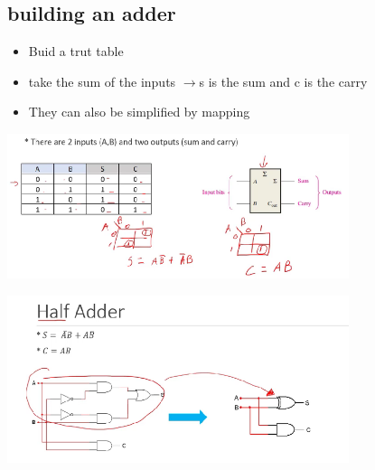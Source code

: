 \documentclass[a4paper,12pt]{article}
\newcommand{\ra}{$\rightarrow$}
\begin{document}
        \subsection{building an adder}
            \begin{itemize}
                \item Buid a trut table
                \item take the sum of the inputs \ra s is the sum and c is the carry
                \item They can also be simplified by mapping
            \end{itemize}
            \begin{minipage}{8cm}
                \includegraphics[width=10cm]{adderEX1.png}                
            \end{minipage} \hspace*{10pt}
            \begin{minipage}{6cm}
                \includegraphics[width=10cm]{Halfadder1.png}                
            \end{minipage}
\end{document}
